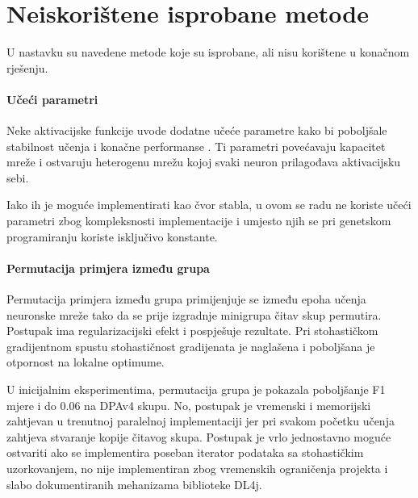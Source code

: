 \documentclass[times, utf8, numeric, diplomski]{fer}
\def\TODO#1{\noindent\textcolor{red}{TODO: \textit{#1}}\newline}
\def\todo#1{\TODO{#1}}
\begin{document}
%

\chapter{Neiskorištene isprobane metode}
U nastavku su navedene metode koje su isprobane, ali nisu korištene u konačnom rješenju.

\subsubsection{Učeći parametri}
Neke aktivacijske funkcije uvode dodatne učeće parametre kako bi poboljšale stabilnost učenja i konačne performanse \citep{prelu, apl, network_in_network}. Ti parametri povećavaju kapacitet mreže i ostvaruju heterogenu mrežu kojoj svaki neuron prilagođava aktivacijsku sebi.

Iako ih je moguće implementirati kao čvor stabla, u ovom se radu ne koriste učeći parametri zbog kompleksnosti implementacije i umjesto njih se pri genetskom programiranju koriste isključivo konstante.

\subsubsection{Permutacija primjera između grupa}
Permutacija primjera između grupa primijenjuje se između epoha učenja neuronske mreže tako da se prije izgradnje minigrupa čitav skup permutira. Postupak ima regularizacijski efekt i pospješuje rezultate. Pri stohastičkom gradijentnom spustu stohastičnost gradijenata je naglašena i poboljšana je otpornost na lokalne optimume.

U inicijalnim eksperimentima, permutacija grupa je pokazala poboljšanje F1 mjere i do $0.06$ na DPAv4 skupu. No, postupak je vremenski i memorijski zahtjevan u trenutnoj paralelnoj implementaciji jer pri svakom početku učenja zahtjeva stvaranje kopije čitavog skupa. Postupak je vrlo jednostavno moguće ostvariti ako se implementira poseban iterator podataka sa stohastičkim uzorkovanjem, no nije implementiran zbog vremenskih ograničenja projekta i slabo dokumentiranih mehanizama biblioteke DL4j.
\end{document}
